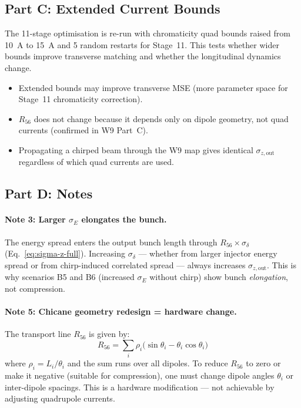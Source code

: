 \documentclass[11pt]{article}
\begin{document}
\subsection{Part C: Extended Current Bounds}

The 11-stage optimisation is re-run with chromaticity quad bounds raised from
\SI{10}{A} to \SI{15}{A} and 5 random restarts for Stage~11.  This tests
whether wider bounds improve transverse matching and whether the longitudinal
dynamics change.

\begin{itemize}
  \item Extended bounds may improve transverse MSE (more parameter space for
    Stage~11 chromaticity correction).
  \item $R_{56}$ does not change because it depends only on dipole geometry,
    not quad currents (confirmed in W9 Part~C).
  \item Propagating a chirped beam through the W9 map gives identical
    $\sigma_{z,\text{out}}$ regardless of which quad currents are used.
\end{itemize}


\subsection{Part D: Notes}

\paragraph{Note 3: Larger $\sigma_E$ elongates the bunch.}
The energy spread enters the output bunch length through $R_{56}\times\sigma_\delta$
(Eq.~\ref{eq:sigma-z-full}).  Increasing $\sigma_\delta$ --- whether from larger
injector energy spread or from chirp-induced correlated spread --- always
increases $\sigma_{z,\text{out}}$.  This is why scenarios B5 and B6 (increased
$\sigma_E$ without chirp) show bunch \emph{elongation}, not compression.

\paragraph{Note 5: Chicane geometry redesign = hardware change.}
The transport line $R_{56}$ is given by:
\begin{equation}
  R_{56} = \sum_i \rho_i\bigl(\sin\theta_i - \theta_i\cos\theta_i\bigr)
  \label{eq:R56-geometry}
\end{equation}
where $\rho_i = L_i/\theta_i$ and the sum runs over all dipoles.  To reduce
$R_{56}$ to zero or make it negative (suitable for compression), one must
change dipole angles $\theta_i$ or inter-dipole spacings.  This is a hardware
modification --- not achievable by adjusting quadrupole currents.
\end{document}
